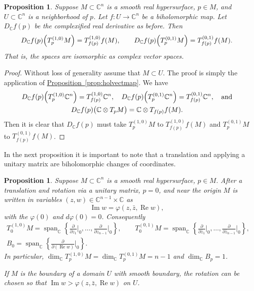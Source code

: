 \documentclass[12pt,openany]{book}
\renewcommand{\Re}{\operatorname{Re}}
\renewcommand{\Im}{\operatorname{Im}}
\newcommand{\C}{{\mathbb{C}}}
\theoremstyle{plain}
\newtheorem{prop}[thm]{Proposition}
\theoremstyle{remark}
\theoremstyle{definition}
\theoremstyle{exercise}
\theoremstyle{example}
\newcommand{\propref}[1]{\hyperref[#1]{Proposition~\ref*{#1}}}
\begin{document}
\begin{prop}
Suppose $M \subset \C^n$ is a smooth real hypersurface, $p \in M$,
and $U \subset \C^n$ is a neighborhood of $p$.
Let $f \colon U \to \C^n$ be a biholomorphic map.  Let $D_\C f(p)$ be
the complexified real derivative as before.  Then
\begin{equation*}
D_\C f(p)\Bigl(T_p^{(1,0)}M\Bigr) = T_{f(p)}^{(1,0)}f(M), \qquad
D_\C f(p)\Bigl(T_p^{(0,1)}M\Bigr) = T_{f(p)}^{(0,1)}f(M).
\end{equation*}
That is, the spaces are isomorphic as complex vector spaces.
\end{prop}

\begin{proof}
Without loss of generality assume that $M \subset U$.
The proof is simply the application of \propref{prop:holvectmap}.  We have
\begin{multline*}
D_\C f(p)\Bigl(T_p^{(1,0)}\C^n\Bigr) = T_{f(p)}^{(1,0)}\C^n, \quad 
D_\C f(p)\Bigl(T_p^{(0,1)}\C^n\Bigr) = T_{f(p)}^{(0,1)}\C^n, \quad
\text{and} \\
D_\C f(p)\bigl(\C \otimes T_pM\bigr) =\C \otimes  T_{f(p)}f(M) .
\end{multline*}
Then it is clear that $D_\C f(p)$ must take
$T_p^{(1,0)}M$ to $T_{f(p)}^{(1,0)}f(M)$ and
$T_p^{(0,1)}M$ to $T_{f(p)}^{(0,1)}f(M)$.
\end{proof}

In the next proposition it is important to note that a translation and
applying a unitary matrix are biholomorphic changes of coordinates.

\begin{prop}
Suppose $M \subset \C^n$ is a smooth real hypersurface, $p \in M$.
After a translation and rotation via a unitary
matrix, $p=0$, and near the origin
$M$ is written in variables $(z,w) \in \C^{n-1}
\times \C$ as
\begin{equation*}
\Im w = \varphi(z,\bar{z},\Re w) ,
\end{equation*}
with the $\varphi(0)$  and $d\varphi(0) = 0$.  Consequently
\begin{gather*}
T_0^{(1,0)} M
= \operatorname{span}_{\C} \left\{
\frac{\partial}{\partial z_1}\Big|_0,
\ldots,
\frac{\partial}{\partial z_{n-1}}\Big|_0 \right\} ,
\qquad
T_0^{(0,1)} M
= \operatorname{span}_{\C} \left\{
\frac{\partial}{\partial \bar{z}_1}\Big|_0,
\ldots,
\frac{\partial}{\partial \bar{z}_{n-1}}\Big|_0 \right\} ,
\\
B_0 = \operatorname{span}_{\C} \left\{
\frac{\partial}{\partial (\Re w)}\Big|_0 \right\} .
\end{gather*}
In particular,
$\dim_\C T_p^{(1,0)} M = \dim_\C T_p^{(0,1)} M = n-1$ and 
$\dim_\C B_p = 1$.

If $M$ is the boundary of a domain $U$ with smooth boundary,
the rotation can be chosen so that
$\Im w > \varphi(z,\bar{z},\Re w)$ on $U$.
\end{prop}
\end{document}
